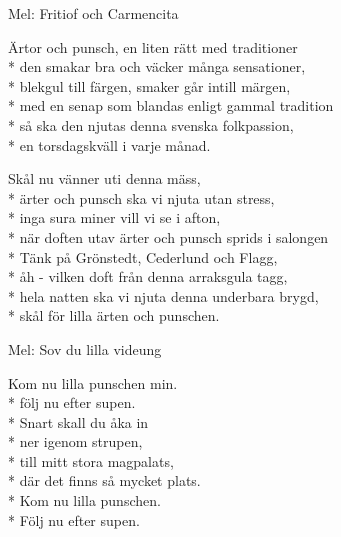 \begin{SongText}
    \begin{SongInfo}
        Mel: Fritiof och Carmencita
    \end{SongInfo}
    \begin{SongVerse}
        Ärtor och punsch, en liten rätt med traditioner\\*%
        den smakar bra och väcker många sensationer,\\*%
        blekgul till färgen, smaker går intill märgen,\\*%
        med en senap som blandas enligt gammal tradition\\*%
        så ska den njutas denna svenska folkpassion,\\*%
        en torsdagskväll i varje månad.
    \end{SongVerse}
    \begin{SongVerse}
        Skål nu vänner uti denna mäss,\\*%
        ärter och punsch ska vi njuta utan stress,\\*%
        inga sura miner vill vi se i afton,\\*%
        när doften utav ärter och punsch sprids i salongen\\*%
        Tänk på Grönstedt, Cederlund och Flagg,\\*%
        åh - vilken doft från denna arraksgula tagg,\\*%
        hela natten ska vi njuta denna underbara brygd,\\*%
        skål för lilla ärten och punschen.
    \end{SongVerse}\end{SongText}
\begin{SongText}
    \begin{SongInfo}
        Mel: Sov du lilla videung
    \end{SongInfo}
    \begin{SongVerse}
        Kom nu lilla punschen min.\\*%
        följ nu efter supen.\\*%
        Snart skall du åka in\\*%
        ner igenom strupen,\\*%
        till mitt stora magpalats,\\*%
        där det finns så mycket plats.\\*%
        Kom nu lilla punschen.\\*%
        Följ nu efter supen.
    \end{SongVerse}\end{SongText}
